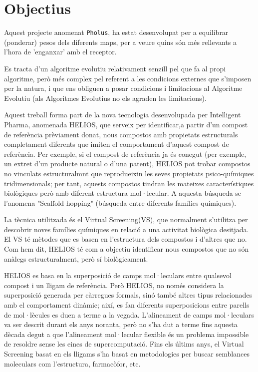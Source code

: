 \documentclass[titlepage,a4paper,12pt]{book}
\begin{document}
\tableofcontents  %
\section{Objectius} %
\label{sec:Objectius}
Aquest projecte anomenat \texttt{Pholus}, ha estat desenvolupat per a equilibrar (ponderar) pesos dels
diferents maps, per a veure quins són més rellevants a l'hora de 'enganxar' amb el receptor.  %

Es tracta d'un algoritme evolutiu relativament senzill pel que fa al propi algoritme, però més
complex pel referent a les condicions externes que s'imposen per la natura, i que ens obliguen a
posar condicions i limitacions al Algoritme Evolutiu (als Algoritmes Evolutius no els agraden les 
limitacions).

Aquest treball forma part de la nova tecnologia desenvolupada per Intelligent Pharma, anomenada HELIOS, que serveix per identificar,a partir d'un compost de referència prèviament donat, nous compostos amb propietats estructurals completament diferents que imiten el comportament d'aquest compost de referència. Per exemple, si el compost de referència ja és conegut (per exemple, un extret d'un producte natural o d'una patent), HELIOS pot trobar compostos no  vinculats estructuralmnt que reprodueixin les seves propietats psico-químiques tridimensionals; per tant, aquests compostos tindran les mateixes característiques biològiques però amb diferent estructura mol·lecular. A aquesta búsqueda se l'anomena "Scaffold hopping" (búsqueda entre diferents famílies químiques).

La tècnica utilitzada és el Virtual Screening(VS), que normalment s'utilitza per descobrir noves famílies químiques en relació a una activitat biològica desitjada. El VS té mètodes que es basen en l'estructura dels compostos i d'altres que no. Com hem dit, HELIOS té com a objectiu identificar nous compostos que no són anàlegs estructuralment, però sí biològicament. 

HELIOS es basa en la superposició de camps mol·leculars entre qualsevol compost i un lligam de referència. Però HELIOS, no només considera la superposició generada per càrregues formals, sinó també altres tipus relacionades amb el comportament dinàmic; així, es fan diferents superposicions entre parells de mol·lècules es duen a terme a la vegada. 
L'alineament de camps mol·leculars va ser descrit durant els anys noranta, però no s'ha dut a terme fins aquesta dècada degut a que l'alineament mol·lecular flexible és un problema impossible de resoldre sense les eines de supercomputació. Fins els últims anys, el Virtual Screening basat en els lligams s'ha basat en metodologies per buscar semblances moleculars com l'estructura, farmacòfor, etc. 
\end{document}
